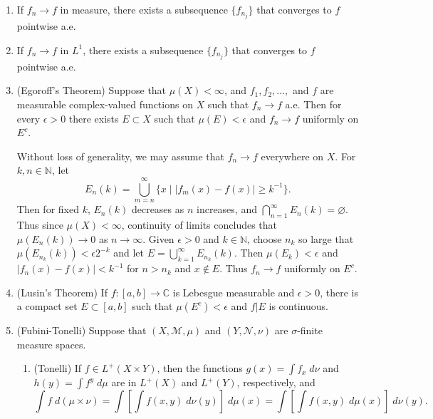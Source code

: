 \documentclass{article}
\begin{document}
\begin{enumerate}[resume=real_analysis]
\begin{solutions}
	\end{solutions}
	\item If $f_{n} \to f$ in measure, there exists a subsequence $\{f_{n_{j}}\}$ that converges to $f$ pointwise a.e. 
	\item If $f_{n} \to f$ in $L^{1}$, there exists a subsequence $\{f_{n_{j}}\}$ that converges to $f$ pointwise a.e. 
	\item (Egoroff's Theorem) Suppose that $\mu(X) < \infty$, and $f_{1}, f_{2}, \ldots,$ and $f$ are measurable complex-valued functions on $X$ such that $f_{n} \to f$ a.e. Then for every $\epsilon > 0$ there exists $E \subset X$ such that $\mu(E) < \epsilon$ and $f_{n} \to f$ uniformly on $E^{c}$. \newline 
	\begin{solutions}
		Without loss of generality, we may assume that $f_{n} \to f$ everywhere on $X$. For $k, n\in \mathbb{N}$, let 
		\begin{equation*}
			E_{n}(k) = \bigcup_{m = n}^{\infty}\{x \mid |f_{m}(x) - f(x)| \geq k^{-1}\}. 
		\end{equation*}
		Then for fixed $k$, $E_{n}(k)$ decreases as $n$ increases, and $\bigcap_{n =1 }^{\infty}E_{n}(k) = \varnothing$. Thus since $\mu(X) < \infty$, continuity of limits concludes that $\mu(E_{n}(k)) \to 0$ as $n \to \infty$. Given $\epsilon > 0$ and $k \in \mathbb{N}$, choose $n_{k}$ so large that $\mu(E_{n_{k}}(k)) < \epsilon 2^{-k}$ and let $E = \bigcup_{k =1}^{\infty}E_{n_{k}}(k)$. Then $\mu(E_{k}) < \epsilon$ and $|f_{n}(x) - f(x)| < k^{-1}$ for $n > n_{k}$ and $x \notin E$. Thus $f_{n} \to f$ uniformly on $E^{c}$.
	\end{solutions}
	\item (Lusin's Theorem) If $f: [a, b] \to \mathbb{C}$ is Lebesgue measurable and $\epsilon > 0$, there is a compact set $E \subset [a, b]$ such that $\mu(E^{c}) < \epsilon$ and $f|E$ is continuous. 
	\item (Fubini-Tonelli) Suppose that $(X, \mathscr{M}, \mu)$ and $(Y, \mathscr{N},\nu)$ are $\sigma$-finite measure spaces. \vspace{-0.25cm}
	\begin{enumerate}[itemsep =-2pt,label = (\alph{*})]
		\item (Tonelli) If $f \in L^{+}(X \times Y)$, then the functions $g(x) = \int f_{x}\;d\nu$ and $h(y) = \int f^{y}\;d\mu$ are in $L^{+}(X)$ and $L^{+}(Y)$, respectively, and 
		\begin{equation*}
			\int f\;d(\mu \times \nu) = \int \left[\int f(x,y)\;d\nu(y)\right]\;d\mu(x) = \int \left[\int f(x,y)\;d\mu(x)\right]\;d\nu(y). 

\end{equation*}
\end{enumerate}
\end{enumerate}
\end{document}
